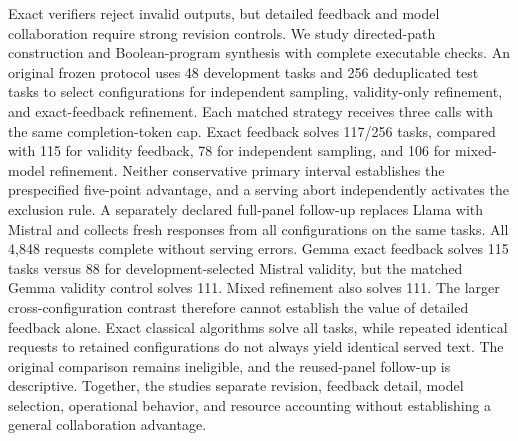 Exact verifiers reject invalid outputs, but detailed feedback and model collaboration require strong revision controls. We study directed-path construction and Boolean-program synthesis with complete executable checks. An original frozen protocol uses 48 development tasks and 256 deduplicated test tasks to select configurations for independent sampling, validity-only refinement, and exact-feedback refinement. Each matched strategy receives three calls with the same completion-token cap. Exact feedback solves 117/256 tasks, compared with 115 for validity feedback, 78 for independent sampling, and 106 for mixed-model refinement. Neither conservative primary interval establishes the prespecified five-point advantage, and a serving abort independently activates the exclusion rule. A separately declared full-panel follow-up replaces Llama with Mistral and collects fresh responses from all configurations on the same tasks. All 4,848 requests complete without serving errors. Gemma exact feedback solves 115 tasks versus 88 for development-selected Mistral validity, but the matched Gemma validity control solves 111. Mixed refinement also solves 111. The larger cross-configuration contrast therefore cannot establish the value of detailed feedback alone. Exact classical algorithms solve all tasks, while repeated identical requests to retained configurations do not always yield identical served text. The original comparison remains ineligible, and the reused-panel follow-up is descriptive. Together, the studies separate revision, feedback detail, model selection, operational behavior, and resource accounting without establishing a general collaboration advantage.
